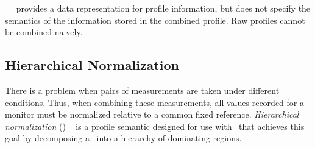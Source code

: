 \CP\ ~\cite{BerubePhD} provides a data representation for profile information, but does
not specify the semantics of the information stored in the combined
profile.  Raw profiles cannot be combined naively. %


\subsection{Hierarchical Normalization}
\label{cp:hn}

There is a problem when pairs of measurements are taken under different
conditions.  Thus, when
combining these measurements, all values recorded for a monitor must
be normalized relative to a common fixed reference.  {\em Hierarchical
  normalization} (\HN) ~\cite{BerubePhD} is a profile semantic designed for use with
\CP\ that achieves this goal by decomposing a \CFG\ into a hierarchy
of dominating regions.

